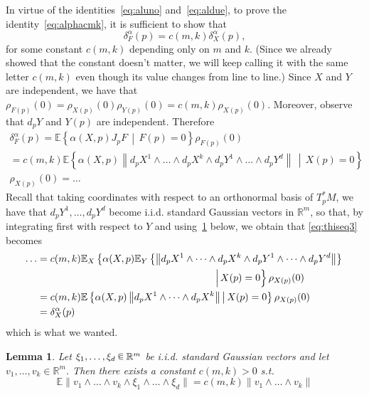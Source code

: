 \documentclass[10pt]{amsart}
\newtheorem{lemm}[theo]{Lemma}\newtheorem{prop}[theo]{Proposition}\newtheorem{coro}[theo]{Corollary}\newtheorem{conj}[theo]{Conjecture}
\theoremstyle{definition}\newtheorem{defi}[theo]{Definition}\newtheorem{rema}[theo]{Remark}\newtheorem{exam}[theo]{Example}\newtheorem{exem}[theo]{Example}\newtheorem{nota}[theo]{Notation}
\newcommand{\R}{\mathbb{R}}
\newcommand{\EE}{\mathbb{E}}
\renewcommand{\a}{\alpha}
\newcommand*\randin{
\mathchoice {\raisebox{-.35ex}{$\displaystyle{^\subset}$}\mkern-11.5mu\raisebox{+.45ex}{$\displaystyle{_\subset}$}} {\mkern+1mu\raisebox{-.27ex}{$\textstyle{^\subset}$}\mkern-11.7mu\raisebox{+.45ex}{$\textstyle{_\subset}$}} {\raisebox{.35ex}{$\scriptstyle\subset$}\mkern-14mu\raisebox{-.15ex}{$\scriptstyle\subset$}} {\raisebox{.3ex}{$\scriptscriptstyle\subset$}\mkern-13.5mu\raisebox{-.10ex}{$\scriptscriptstyle\subset$}}}
\begin{document}
In virtue of the identities~\eqref{eq:aluno} and~\eqref{eq:aldue}, to prove the identity~\eqref{eq:alphacmk}, it is sufficient to show that
\begin{equation*}
\delta^\a_F(p)=c(m,k)\delta^\a_X(p),
\end{equation*}
for some constant $c(m,k)$ depending only on $m$ and $k$. (Since we already showed that the constant doesn't matter, we will keep calling it with the same letter $c(m,k)$ even though its value changes from line to line.) Since $X$ and $Y$ are independent, we have that $\rho_{F(p)}(0)=\rho_{X(p)}(0)\rho_{Y(p)}(0)=c(m,k)\rho_{X(p)}(0)$. Moreover, observe that $d_pY$ and $Y(p)$ are independent. Therefore
\begin{multline}\label{eq:thiseq3}
\delta^\a_F(p)
 =\EE\left\{\a(X,p)J_pF\,\middle|\,F(p)=0\right\}\rho_{F(p)}(0)
\\
= c(m,k)\EE\left\{\a(X,p)\left\|d_pX^1\wedge \dots \wedge d_pX^k\wedge d_pY^1\wedge \dots \wedge d_pY^d \right\|\,\middle|\, X(p)=0\right\}
\\
\rho_{X(p)}(0)=\dots
\end{multline}
Recall that taking coordinates with respect to an orthonormal basis of $T^*_pM$, we have that $d_pY^1,\dots,d_pY^d$ become i.i.d. standard Gaussian vectors in $\R^m$, so that, by integrating first with respect to $Y$ and using~\cref{lem:hate2} below, we obtain that \eqref{eq:thiseq3} becomes
\begin{align*}
\dots
&=c(m,k)\EE_{X}\left\{\a(X,p)\EE_Y\left\{\left\|d_pX^1\wedge \dots \wedge d_pX^k\wedge d_pY^1\wedge \dots \wedge d_pY^d\right\|\right\}\right.\\
&\mkern318mu\left.\Big|\, X(p)=0\right\}\rho_{X(p)}(0)
\\
&= c(m,k)\EE\left\{\a(X,p)\left\|d_pX^1\wedge \dots \wedge d_pX^k\right\|\,\middle|\, X(p)=0\right\}\rho_{X(p)}(0)\\ 
&=\delta^\a_X(p)
\end{align*}
which is what we wanted.

\begin{lemm}\label{lem:hate2}
Let $\xi_1,\dots,\xi_d\,\randin\, \R^m$ be i.i.d. standard Gaussian vectors and let $v_1,\dots,v_k\in\R^m$. Then there exists a constant $c(m,k)>0$ s.t.
\begin{equation*}
\EE\|v_1\wedge \dots \wedge v_k\wedge \xi_1\wedge \dots \wedge \xi_d\|=c(m,k)\|v_1\wedge \dots \wedge v_k\|
\end{equation*}
\end{lemm}
\end{document}
